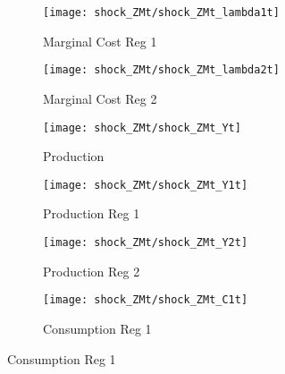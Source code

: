 \documentclass[../thesis.tex]{subfiles}
\begin{document}
\begin{figure}[h!]
		\begin{subfigure}[b]{0.3\textwidth}
			\centering
			\texttt{[image: shock\_ZMt/shock\_ZMt\_lambda1t]}
			\caption{\footnotesize Marginal Cost Reg 1}
			\label{fig:ZMt-lambda1t}
		\end{subfigure}
		\hfill
		\begin{subfigure}[b]{0.3\textwidth}
			\centering
			\texttt{[image: shock\_ZMt/shock\_ZMt\_lambda2t]}
			\caption{\footnotesize Marginal Cost Reg 2}
			\label{fig:ZMt-lambda2t}
		\end{subfigure}
		\hfill
		\begin{subfigure}[b]{0.3\textwidth}
			\centering
			\texttt{[image: shock\_ZMt/shock\_ZMt\_Yt]}
			\caption{\footnotesize Production}
			\label{fig:ZMt-Yt}
		\end{subfigure}
		\hfill		
		\vspace*{0.5cm}

	
		\begin{subfigure}[b]{0.3\textwidth}
			\centering
			\texttt{[image: shock\_ZMt/shock\_ZMt\_Y1t]}
			\caption{\footnotesize Production Reg 1}
			\label{fig:ZMt-Y1t}
		\end{subfigure}
		\hfill
		\begin{subfigure}[b]{0.3\textwidth}
			\centering
			\texttt{[image: shock\_ZMt/shock\_ZMt\_Y2t]}
			\caption{\footnotesize Production Reg 2}
			\label{fig:ZMt-Y2t}
		\end{subfigure}
		\hfill
		\begin{subfigure}[b]{0.3\textwidth}
			\centering
			\texttt{[image: shock\_ZMt/shock\_ZMt\_C1t]}
			\caption{\footnotesize Consumption Reg 1}
			\label{fig:ZMt-C1t}
		\end{subfigure}
		\hfill
		\vspace*{0.5cm}
		


\end{figure}
\end{document}
